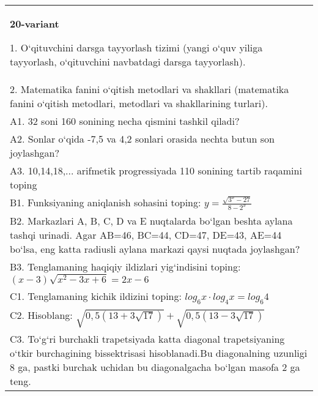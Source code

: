 \documentclass{article}
\begin{document}
\begin{tabular}{m{17cm}}
\textbf{20-variant}

1. O‘qituvchini darsga tayyorlash tizimi (yangi o‘quv yiliga tayyorlash, o‘qituvchini navbatdagi darsga tayyorlash). \\
2. Matematika fanini o‘qitish metodlari va shakllari (matematika fanini o‘qitish metodlari, metodlari va shakllarining turlari). \\
A1. 32 soni 160 sonining necha qismini tashkil qiladi? \\
A2. Sonlar o‘qida -7,5 va 4,2 sonlari orasida nechta butun son joylashgan? \\
A3. 10,14,18,... arifmetik progressiyada 110 sonining tartib raqamini toping \\
B1. Funksiyaning aniqlanish sohasini toping: \(y = \frac{\sqrt{3^{x} - 27}}{8 - 2^{x}}\) \\
B2. Markazlari A, B, C, D va E nuqtalarda bo‘lgan beshta aylana tashqi urinadi. Agar AB=46, BC=44, CD=47, DE=43, AE=44 bo‘lsa, eng katta radiusli aylana markazi qaysi nuqtada joylashgan? \\
B3. Tenglamaning haqiqiy ildizlari yig‘indisini toping: \((x-3) \sqrt{x^{2} - 3x + 6} = 2x - 6\) \\
C1. Tenglamaning kichik ildizini toping: \(log_{6}x \cdot log_{4}x = log_{6}4\) \\
C2. Hisoblang: \(\sqrt{0,5 (13 + 3\sqrt{17}) } + \sqrt{0,5 (13 - 3\sqrt{17}) }\) \\
C3. To‘g‘ri burchakli trapetsiyada katta diagonal trapetsiyaning o‘tkir burchagining bissektrisasi hisoblanadi.Bu diagonalning uzunligi 8 ga, pastki burchak uchidan bu diagonalgacha bo‘lgan masofa 2 ga teng. \\

\end{tabular}
\vspace{1cm}
\end{document}
